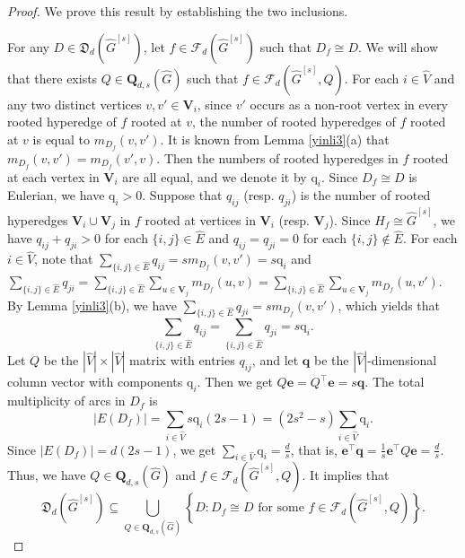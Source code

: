 \documentclass{article}
\begin{document}
\begin{proof}
We prove this result by establishing the two inclusions.

For any $D \in \mathfrak{D}_{d}(\widehat{G}^{[s]})$,
let $f \in \mathcal{F}_{d}(\widehat{G}^{[s]})$ such that $D_{f} \cong D$.
We will show that there exists $Q \in \mathbf{Q}_{d,s}(\widehat{G})$ such that $f \in \mathcal{F}_{d}(\widehat{G}^{[s]},Q)$.
For each $i \in \widehat{V}$ and any two distinct vertices $v,v' \in \mathbf{V}_{i}$,
since $v'$ occurs as a non-root vertex in every rooted hyperedge of $f$ rooted at $v$,
the number of rooted hyperedges of $f$ rooted at $v$ is equal to $m_{D_f}(v,v')$.
It is known from Lemma \ref{yinli3}(a) that $m_{D_f}(v,v')=m_{D_f}(v',v)$.
Then the numbers of rooted hyperedges in $f$ rooted at each vertex in $\mathbf{V}_{i}$ are all equal,
and we denote it by $\mathrm{q}_{i}$.
Since $D_{f} \cong D$ is Eulerian,
we have $\mathrm{q}_{i} >0$.
Suppose that $q_{ij}$ (resp. $q_{ji}$) is the number of rooted hyperedges $\mathbf{V}_{i} \cup \mathbf{V}_{j}$ in $f$ rooted at vertices in $\mathbf{V}_{i}$ (resp. $\mathbf{V}_{j}$).
Since $H_{f} \cong \widehat{G}^{[s]}$,
we have $q_{ij}+q_{ji}>0$ for each $\{i,j\} \in \widehat{E}$ and $q_{ij}=q_{ji}=0$ for each $\{i,j\} \notin \widehat{E}$.
For each $i \in \widehat{V}$,
note that $\sum_{\{i,j\} \in \widehat{E}}q_{ij}=sm_{D_f}(v,v')=s\mathrm{q}_{i}$ and $\sum_{\{i,j\} \in \widehat{E}}q_{ji}=\sum_{\{i,j\} \in \widehat{E}}\sum_{u \in \mathbf{V}_{j}}m_{D_f}(u,v)=\sum_{\{i,j\} \in \widehat{E}}\sum_{u \in \mathbf{V}_{j}}m_{D_f}(u,v')$.
By Lemma \ref{yinli3}(b),
we have $\sum_{\{i,j\}\in\widehat{E}}q_{ji}=sm_{D_f}(v,v')$,
which yields that $$\sum_{\{i,j\} \in \widehat{E}}q_{ij}=\sum_{\{i,j\}\in\widehat{E}}q_{ji}=s\mathrm{q}_{i}.$$
Let $Q$ be the $|\widehat{V}| \times |\widehat{V}|$ matrix with entries $q_{ij}$,
and let $\mathbf{q}$ be the $|\widehat{V}|$-dimensional column vector with components $\mathrm{q}_{i}$.
Then we get $Q\mathbf{e}=Q^{\top}\mathbf{e}=s\mathbf{q}$.
The total multiplicity of arcs in $D_f$ is $$|E(D_f)|=\sum_{i \in \widehat{V}}s\mathrm{q}_{i}(2s-1)=(2s^{2}-s)\sum_{i \in \widehat{V}}\mathrm{q}_{i}.$$
Since $|E(D_f)|=d(2s-1)$,
we get $\sum_{i \in \widehat{V}}\mathrm{q}_{i}=\frac{d}{s}$,
that is, $\mathbf{e}^{\top}\mathbf{q}=\frac{1}{s}\mathbf{e}^{\top}Q\mathbf{e}=\frac{d}{s}$.
Thus,
we have $Q \in \mathbf{Q}_{d,s}(\widehat{G})$ and $f \in \mathcal{F}_{d}(\widehat{G}^{[s]},Q)$.
It implies that $$\mathfrak{D}_{d}(\widehat{G}^{[s]})\subseteq
\bigcup_{Q \in \mathbf{Q}_{d,s}(\widehat{G})}\left\{ D : \mbox{$D_{f} \cong D$ for some $f \in \mathcal{F}_{d}(\widehat{G}^{[s]},Q)$} \right\}.$$


\end{proof}
\end{document}
